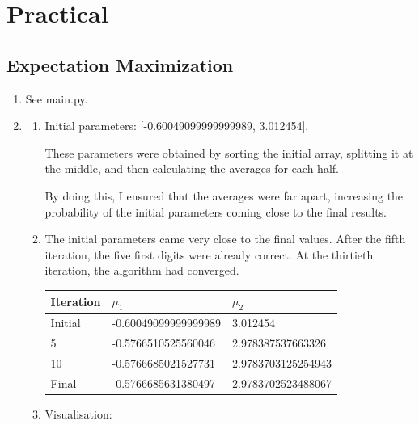 \documentclass{article}
\begin{document}
\section{Practical}
\subsection*{Expectation Maximization}
\begin{enumerate}
    \item
        See main.py.
    
    \item
        \begin{enumerate}[label=(\alph*)]
            \item
                Initial parameters: [-0.60049099999999989, 3.012454].
                
                These parameters were obtained by sorting the initial array, splitting it at the middle, and then calculating the averages for each half.
                
                By doing this, I ensured that the averages were far apart, increasing the probability of the initial parameters coming close to the final results.
            
            \item
                The initial parameters came very close to the final values. After the fifth iteration, the five first digits were already correct. At the thirtieth iteration, the algorithm had converged.
            
                \begin{tabular}{|l|l|l|}
                    \hline
                    \textbf{Iteration} & \textbf{$\mu_1$} & \textbf{$\mu_2$} \\\hline
                    Initial & -0.60049099999999989 & 3.012454 \\\hline
                    5     & -0.5766510525560046 & 2.978387537663326 \\\hline
                    10    & -0.5766685021527731 &  2.9783703125254943 \\\hline
                    Final & -0.5766685631380497 &  2.9783702523488067 \\\hline
                \end{tabular}
                
            \item
                Visualisation:
            

\end{enumerate}
\end{enumerate}
\end{document}
